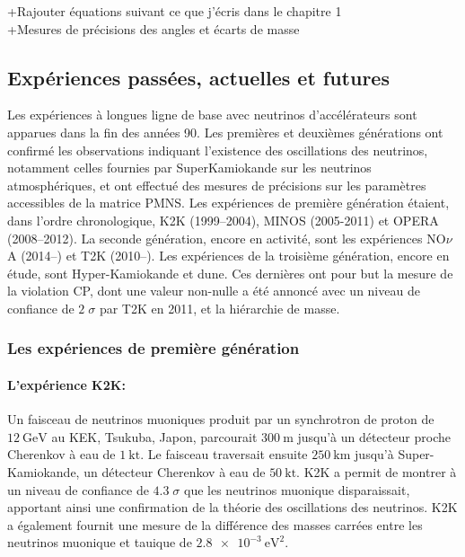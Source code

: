             +Rajouter équations suivant ce que j'écris dans le chapitre 1\\
            +Mesures de précisions des angles et écarts de masse
    
                    
        \subsection{Expériences passées, actuelles et futures}
        
            Les expériences à longues ligne de base avec neutrinos d'accélérateurs sont apparues dans la fin des années 90. Les premières et deuxièmes générations ont confirmé les observations indiquant l'existence des oscillations des neutrinos, notamment celles fournies par SuperKamiokande\cite{superkamiokande} sur les neutrinos atmosphériques, et ont effectué des mesures de précisions sur les paramètres accessibles de la matrice PMNS. Les expériences de première génération étaient, dans l'ordre chronologique, K2K\cite{k2k} (1999--2004), MINOS\cite{minos} (2005-2011) et OPERA\cite{opera} (2008--2012). La seconde génération, encore en activité, sont les expériences NO$\nu$A\cite{nova} (2014--) et T2K (2010--). Les expériences de la troisième génération, encore en étude, sont Hyper-Kamiokande\cite{hyper-k} et \gls{dune}\cite{Acciarri2016}. Ces dernières ont pour but la mesure de la violation CP, dont une valeur non-nulle a été annoncé avec un niveau de confiance de $2\;\sigma$\cite{t2k-cp} par T2K en 2011, et la hiérarchie de masse.
            
            \subsubsection{Les expériences de première génération}
            \paragraph{L'expérience K2K\cite{K2K}:} Un faisceau de neutrinos muoniques produit par un synchrotron de proton de $\SI{12}{\giga\electronvolt}$ au KEK, Tsukuba, Japon, parcourait $\SI{300}{\meter}$ jusqu'à un détecteur proche Cherenkov à eau de $\SI{1}{\kilo\tonne}$. Le faisceau traversait ensuite $\SI{250}{\kilo\meter}$ jusqu'à Super-Kamiokande, un détecteur Cherenkov à eau de $\SI{50}{\kilo\tonne}$. K2K a permit de montrer à un niveau de confiance de $4.3\;\sigma$ que les neutrinos muonique disparaissait, apportant ainsi une confirmation de la théorie des oscillations des neutrinos. K2K a également fournit une mesure de la différence des masses carrées entre les neutrinos muonique et tauique de $\SI{2.8e-3}{\electronvolt\squared}$.
            
